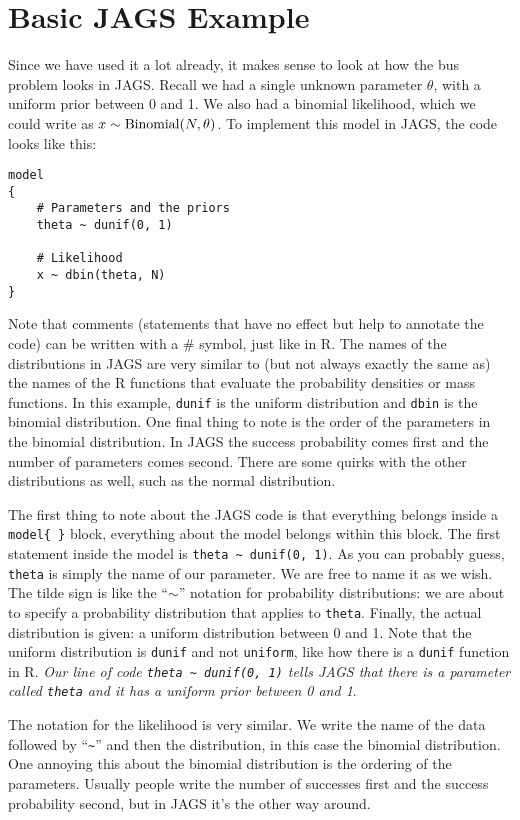 \section{Basic JAGS Example}
Since we have used it a lot already, it makes sense to look at how the bus
problem looks in JAGS. Recall we had a
single unknown parameter $\theta$, with a uniform prior between 0 and 1.
We also had a binomial likelihood, which we could write as
$x \sim \textnormal{Binomial}(N, \theta)$.
To implement this model in JAGS, the code looks like this:
\begin{framed}
\begin{verbatim}
model
{
    # Parameters and the priors
    theta ~ dunif(0, 1)

    # Likelihood
    x ~ dbin(theta, N)
}
\end{verbatim}
\end{framed}
Note that comments (statements that have no effect but help to annotate the
code) can be written with a \# symbol, just like in R.
The names of the distributions in JAGS are very similar to (but not always
exactly the same as) the names of the R functions that evaluate the probability
densities or mass functions. In this example, {\tt dunif} is the uniform
distribution and {\tt dbin} is the binomial distribution. One final thing to
note is the order of the parameters in the binomial distribution. In JAGS the
success probability comes first and the number of parameters comes second.
There are some quirks with the other distributions as well, such as the normal
distribution.

The first thing to note about the JAGS code is that everything belongs inside
a {\tt model\{   \}} block, everything about the model belongs within this
block.
The first statement inside the model is {\tt theta \~{ } dunif(0, 1)}. As you
can probably guess, {\tt theta}
is simply the name of our parameter. We are free to name it as we
wish. The tilde sign is like the ``$\sim$'' notation for probability distributions: we are
about to specify a probability distribution that applies to {\tt theta}. Finally,
the actual distribution is given: a uniform distribution between 0 and 1. Note
that the uniform distribution is {\tt dunif} and not {\tt uniform}, like how
there is a {\tt dunif} function in R. {\it Our line of code {\tt theta \~{ } dunif(0, 1)}
tells JAGS
that there is a parameter called {\tt theta} and it has a uniform prior between
0 and 1}.

The notation for the likelihood is very similar. We write the name of the data
followed by ``{\tt \~{ }}'' and then the distribution, in this case the
binomial distribution.
One annoying this about the binomial distribution is the ordering of the parameters.
Usually people write the number of successes first and the success probability
second, but in JAGS it's the other way around.

